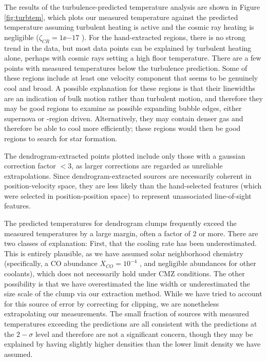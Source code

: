 The results of the turbulence-predicted temperature analysis are shown in 
Figure \ref{fig:turbtem}, which plots our measured temperature against
the predicted temperature assuming turbulent heating is active and the
cosmic ray heating is negligible ($\zeta_{CR}=1\ee{-17}$ \pers).  For the
hand-extracted regions, there is no strong trend in the data, but most data
points can be explained by turbulent heating alone, perhaps with cosmic rays
setting a high floor temperature.  There are a few points with measured
temperatures below the turbulence prediction.  Some of these regions
include at least one velocity component that seems
to be genuinely cool and broad.  A possible explanation for these regions is
that their linewidths are an indication of bulk motion rather than turbulent
motion, and therefore they may be good regions to examine as possible expanding
bubble edges, either supernova or \hii-region driven.  Alternatively, they may
contain denser gas and therefore be able to cool more efficiently; these regions
would then be good regions to search for star formation.

The dendrogram-extracted points plotted include only those with a gaussian
correction factor $<3$, as larger corrections are regarded as unreliable
extrapolations.  Since dendrogram-extracted sources are necessarily coherent in
position-velocity space, they are less likely than the hand-selected features
(which were selected in position-position space) to represent unassociated
line-of-sight features.

The predicted temperatures for dendrogram clumps frequently exceed the measured
temperatures by a large margin, often a factor of 2 or more.  There are two
classes of explanation: First, that the cooling rate has been underestimated.
This is entirely plausible, as we have assumed solar neighborhood chemistry
(specifically, a CO abundance $X_{CO}=10^{-4}$ \hh, and negligible abundances
for other
coolants), which does not necessarily hold under CMZ conditions.  The other
possibility is that we have overestimated the line width or underestimated the
size scale of the clump via our extraction method.  While we have tried to
account for this source of error by correcting for clipping, we are nonetheless
extrapolating our measurements.  The small fraction of sources with measured
temperatures exceeding the predictions are all consistent with the predictions
at the $2-\sigma$ level and therefore are not a significant concern, though
they may be explained by having slightly higher densities than the lower limit
density we have assumed.

